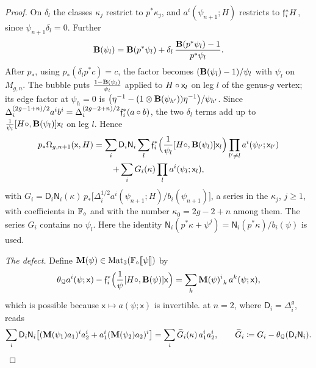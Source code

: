 \begin{proof}
On $\delta_l$ the classes $\kappa_j$ restrict to $p^*\kappa_j$, and $a^i(\psi_{n+1};H)$ restricts to $\mathfrak{f}_i^*H$, since $\psi_{n+1}\delta_l=0$. Further
\[
\mathbf{B}(\psi_l)=\mathbf{B}(p^*\psi_l)+\delta_l\,\frac{\mathbf{B}(p^*\psi_l)-1}{p^*\psi_l}.
\]
After $p_*$, using $p_*(\delta_lp^*c)=c$, the factor becomes $(\mathbf{B}(\psi_l)-1)/\psi_l$ with $\psi_l$ on $M_{g,n}$. The bubble puts $\frac{1-\mathbf{B}(\psi_l)}{\psi_l}$ applied to $H\circ\mathsf{x}_l$ on leg $l$ of the genus-$g$ vertex; its edge factor at $\psi_h=0$ is $\big(\eta^{-1}-(1\otimes\mathbf{B}(\psi_{h'}))\eta^{-1}\big)/\psi_{h'}$. Since $\Delta_i^{(2g-1+n)/2}a^ib^i=\Delta_i^{(2g-2+n)/2}\mathfrak{f}_i^*(a\circ b)$, the two $\delta_l$ terms add up to $\frac{1}{\psi_l}[H\circ,\mathbf{B}(\psi_l)]\mathsf{x}_l$ on leg $l$. Hence
\begin{multline*}
p_*\Omega_{g,n+1}(\mathsf{x},H)=\sum_i\mathsf{D}_i\mathsf{N}_i\sum_l\mathfrak{f}_i^*\Big(\frac{1}{\psi_l}[H\circ,\mathbf{B}(\psi_l)]\mathsf{x}_l\Big)\prod_{l'\neq l}a^i(\psi_{l'};\mathsf{x}_{l'})\\
+\sum_iG_i(\kappa)\prod_la^i(\psi_l;\mathsf{x}_l),
\end{multline*}
with $G_i=\mathsf{D}_i\mathsf{N}_i(\kappa)\,p_*\big[\Delta_i^{1/2}a^i(\psi_{n+1};H)/b_i(\psi_{n+1})\big]$, a series in the $\kappa_j$, $j\geq1$, with coefficients in $\mathbb{F}_{\circ}$ and with the number $\kappa_0=2g-2+n$ among them. The series $G_i$ contains no $\psi_l$. Here the identity $\mathsf{N}_i(p^*\kappa+\psi^j)=\mathsf{N}_i(p^*\kappa)/b_i(\psi)$ is used.

\emph{The defect.} Define $\mathbf{M}(\psi)\in\mathrm{Mat}_3(\mathbb{F}_{\circ}[\![ \psi ]\!])$ by
\[
\thQ a^i(\psi;\mathsf{x})-\fid_i^*\Big(\frac{1}{\psi}[H\qprod,\Rinv(\psi)]\mathsf{x}\Big)=\sum_k\Mdef(\psi)^i_{\ k}\,a^k(\psi;\mathsf{x}),
\]
which is possible because $\mathsf{x}\mapsto a(\psi;\mathsf{x})$ is invertible.  at $n=2$, where $\mathsf{D}_i=\Delta_i^g$, reads
\[
\sum_i\mathsf{D}_i\mathsf{N}_i\big[(\mathbf{M}(\psi_1)a_1)^ia_2^i+a_1^i(\mathbf{M}(\psi_2)a_2)^i\big]=\sum_i\widetilde{G}_i(\kappa)\,a_1^ia_2^i,\qquad\widetilde{G}_i\coloneqq G_i-\theta_{\mathcal{Q}}(\mathsf{D}_i\mathsf{N}_i).
\]


\end{proof}

